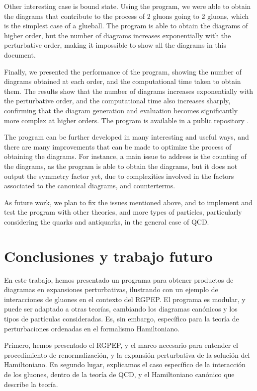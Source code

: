 \documentclass[11pt,a4paper,twoside,pdf]{article}
\numberwithin{equation}{section}
\begin{document}
Other interesting case is bound state.
Using the program, we were able to obtain the diagrams that contribute to the process
of 2 gluons going to 2 gluons, which is the simplest case of a glueball.
The program is able to obtain the diagrams of higher order, but the number of
diagrams increases exponentially with the perturbative order, making it impossible
to show all the diagrams in this document.

Finally, we presented the performance of the program, showing the number of diagrams
obtained at each order, and the computational time taken to obtain them. The results
show that the number of diagrams increases exponentially with the perturbative order,
and the computational time also increases sharply, confirming that the diagram generation
and evaluation becomes significantly more complex at higher orders.
The program is available in a public repository \cite{Liu_Computational_tools_for_2025}.

The program can be further developed in many interesting and useful ways, and there are many improvements that can
be made to optimize the process of obtaining the diagrams. For instance, a main issue to
address is the counting of the diagrams, as the program is able to obtain the diagrams,
but it does not output the symmetry factor yet, due to complexities involved in the factors
associated to the canonical diagrams, and counterterms.

As future work, we plan to fix the issues mentioned above, and to implement and 
test the program with other theories, and more types of particles, particularly
considering the quarks and antiquarks, in the general case of QCD. 

\section{Conclusiones y trabajo futuro} \label{sec:conclusions_es}

En este trabajo, hemos presentado un programa para obtener productos de diagramas en
expansiones perturbativas, ilustrando con un ejemplo de interacciones de gluones en
el contexto del RGPEP.
El programa es modular, y puede ser adaptado a otras teor\'ias, cambiando los
diagramas can\'onicos y los tipos de part\'iculas consideradas. Es, sin embargo, espec\'ifico para
la teor\'ia de perturbaciones ordenadas en el formalismo Hamiltoniano.

Primero, hemos presentado el RGPEP, y el marco necesario para entender el
procedimiento de renormalizaci\'on, y la expansi\'on perturbativa de la solución del Hamiltoniano.
En segundo lugar, explicamos el caso espec\'ifico de la interacción de los gluones, dentro de la
teor\'ia de QCD, y el Hamiltoniano can\'onico que describe la teor\'ia.
\end{document}
